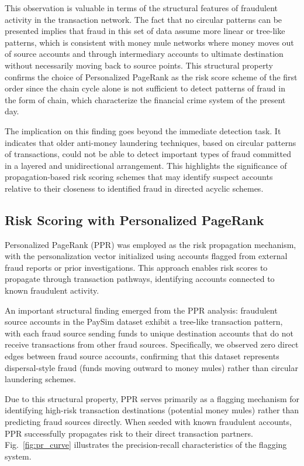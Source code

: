 \documentclass[lettersize,journal]{IEEEtran}
\begin{document}
This observation is valuable in terms of the structural features of fraudulent activity in the transaction network. The fact that no circular patterns can be presented implies that fraud in this set of data assume more linear or tree-like patterns, which is consistent with money mule networks where money moves out of source accounts and through intermediary accounts to ultimate destination without necessarily moving back to source points. This structural property confirms the choice of Personalized PageRank as the risk score scheme of the first order since the chain cycle alone is not sufficient to detect patterns of fraud in the form of chain, which characterize the financial crime system of the present day.

The implication on this finding goes beyond the immediate detection task. It indicates that older anti-money laundering techniques, based on circular patterns of transactions, could not be able to detect important types of fraud committed in a layered and unidirectional arrangement. This highlights the significance of propagation-based risk scoring schemes that may identify suspect accounts relative to their closeness to identified fraud in directed acyclic schemes.

\subsection{Risk Scoring with Personalized PageRank}
Personalized PageRank (PPR) was employed as the risk propagation mechanism, with the personalization vector initialized using accounts flagged from external fraud reports or prior investigations. This approach enables risk scores to propagate through transaction pathways, identifying accounts connected to known fraudulent activity.

An important structural finding emerged from the PPR analysis: fraudulent source accounts in the PaySim dataset exhibit a tree-like transaction pattern, with each fraud source sending funds to unique destination accounts that do not receive transactions from other fraud sources. Specifically, we observed zero direct edges between fraud source accounts, confirming that this dataset represents dispersal-style fraud (funds moving outward to money mules) rather than circular laundering schemes.

Due to this structural property, PPR serves primarily as a flagging mechanism for identifying high-risk transaction destinations (potential money mules) rather than predicting fraud sources directly. When seeded with known fraudulent accounts, PPR successfully propagates risk to their direct transaction partners. Fig.~\ref{fig:pr_curve} illustrates the precision-recall characteristics of the flagging system.
\end{document}
